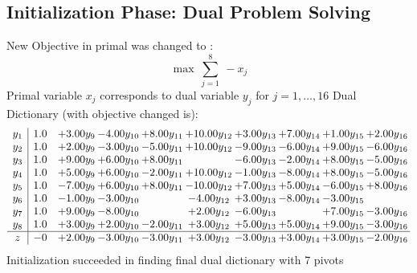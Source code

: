 \documentclass[9pt]{article}
\begin{document}
\subsection{Initialization Phase: Dual Problem Solving}
New Objective in primal was changed to : \[ \max\ \sum_{j=1}^{8}\ - x_j \] 
Primal variable $x_j$ corresponds to dual variable $y_j$ for $j = 1,\ldots,16$
Dual Dictionary (with objective changed is): 
\[\begin{array}{c| c c@{\hskip 2pt} c@{\hskip 2pt} c@{\hskip 2pt} c@{\hskip 2pt} c@{\hskip 2pt} c@{\hskip 2pt} c@{\hskip 2pt} c@{\hskip 2pt} }
 y_{1}   &  1.0 & +  3.00 y_{9} & -4.00 y_{10} & +  8.00 y_{11} & + 10.00 y_{12} & +  3.00 y_{13} & +  7.00 y_{14} & +  1.00 y_{15} & +  2.00 y_{16}\\
 y_{2}   &  1.0 & +  2.00 y_{9} & -3.00 y_{10} & -5.00 y_{11} & + 10.00 y_{12} & -9.00 y_{13} & -6.00 y_{14} & +  9.00 y_{15} & -6.00 y_{16}\\
 y_{3}   &  1.0 & +  9.00 y_{9} & +  6.00 y_{10} & +  8.00 y_{11} &   & -6.00 y_{13} & -2.00 y_{14} & +  8.00 y_{15} & -5.00 y_{16}\\
 y_{4}   &  1.0 & +  5.00 y_{9} & +  6.00 y_{10} & -2.00 y_{11} & + 10.00 y_{12} & -1.00 y_{13} & -8.00 y_{14} & +  8.00 y_{15} & -5.00 y_{16}\\
 y_{5}   &  1.0 & -7.00 y_{9} & +  6.00 y_{10} & +  8.00 y_{11} & -10.00 y_{12} & +  7.00 y_{13} & +  5.00 y_{14} & -6.00 y_{15} & +  8.00 y_{16}\\
 y_{6}   &  1.0 & -1.00 y_{9} & -3.00 y_{10} &   & -4.00 y_{12} & +  3.00 y_{13} & -8.00 y_{14} & -3.00 y_{15} &   \\
 y_{7}   &  1.0 & +  9.00 y_{9} & -8.00 y_{10} &   & +  2.00 y_{12} & -6.00 y_{13} &   & +  7.00 y_{15} & -3.00 y_{16}\\
 y_{8}   &  1.0 & +  3.00 y_{9} & +  2.00 y_{10} & -2.00 y_{11} & +  3.00 y_{12} & +  5.00 y_{13} & +  5.00 y_{14} & +  9.00 y_{15} & -3.00 y_{16}\\
\hline
z    &  -0 & +  2.00 y_{9} & -3.00 y_{10} & -3.00 y_{11} & +  3.00 y_{12} & -3.00 y_{13} & +  3.00 y_{14} & +  3.00 y_{15} & -2.00 y_{16}\\
\end{array}\]
Initialization succeeded in finding final dual dictionary with 7 pivots
\end{document}
